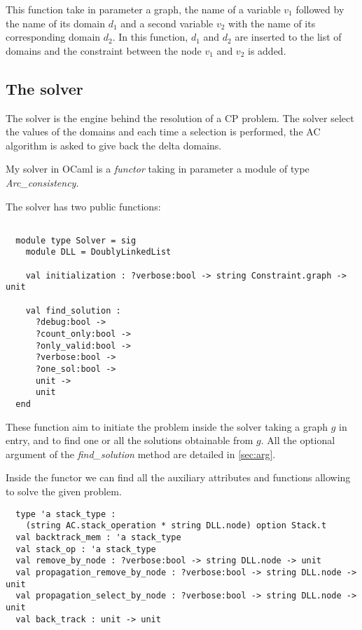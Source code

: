 \documentclass{rapport}
\begin{document}
This function take in parameter a graph, the name of a variable $v_1$ followed by the name of its domain $d_1$ and a second variable $v_2$ with the name of its corresponding domain $d_2$. In this function, $d_1$ and $d_2$ are inserted to the list of domains and the constraint between the node $v_1$ and $v_2$ is added.

\subsection{The solver}

The solver is the engine behind the resolution of a CP problem. The solver select the values of the domains and each time a selection is performed, the AC algorithm is asked to give back the delta domains.

My solver in OCaml is a \textit{functor} taking in parameter a module of type \textit{Arc\_consistency}.

The solver has two public functions:
\begin{verbatim}

  module type Solver = sig
    module DLL = DoublyLinkedList

    val initialization : ?verbose:bool -> string Constraint.graph -> unit

    val find_solution :
      ?debug:bool ->
      ?count_only:bool ->
      ?only_valid:bool ->
      ?verbose:bool ->
      ?one_sol:bool ->
      unit ->
      unit
  end

\end{verbatim}

These function aim to initiate the problem inside the solver taking a graph $g$ in entry, and to find one or all the solutions obtainable from $g$. All the optional argument of the \textit{find\_solution} method are detailed in \cref{sec:arg}.

Inside the functor we can find all the auxiliary attributes and functions allowing to solve the given problem.

\begin{verbatim}
  type 'a stack_type :
    (string AC.stack_operation * string DLL.node) option Stack.t
  val backtrack_mem : 'a stack_type 
  val stack_op : 'a stack_type
  val remove_by_node : ?verbose:bool -> string DLL.node -> unit
  val propagation_remove_by_node : ?verbose:bool -> string DLL.node -> unit
  val propagation_select_by_node : ?verbose:bool -> string DLL.node -> unit
  val back_track : unit -> unit
\end{verbatim}
\end{document}
